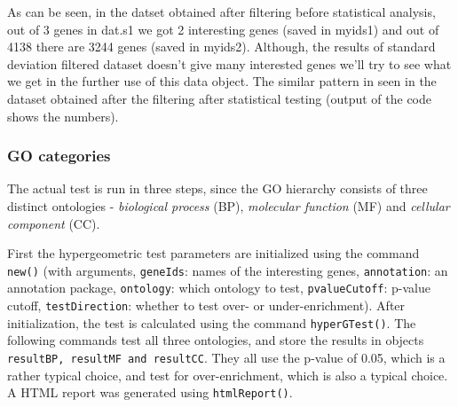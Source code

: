\documentclass[oneside, a4paper, 11pt]{book}
\begin{document}
As can be seen, in the datset obtained after filtering before statistical analysis, out of 3 genes in dat.s1 we got 2 interesting genes (saved in myids1) and out of 4138 there are 3244 genes (saved in myids2). Although, the results of standard deviation filtered dataset doesn't give many interested genes we'll try to see what we get in the further use of this data object. The similar pattern in seen in the dataset obtained after the filtering after statistical testing (output of the code shows the numbers).

\subsubsection{GO categories}
The actual test is run in three steps, since the GO hierarchy consists of three distinct ontologies - \textit{biological process} (BP), \textit{molecular function} (MF) and \textit{cellular component} (CC).

First the hypergeometric test parameters are initialized using the command \texttt{new()} (with arguments, \texttt{geneIds}: names of the interesting genes, \texttt{annotation}: an annotation
package, \texttt{ontology}: which ontology to test, \texttt{pvalueCutoff}: p-value cutoff, \texttt{testDirection}: whether to test over- or under-enrichment). After initialization, the test is calculated using the command \texttt{hyperGTest()}.
The following commands test all three ontologies, and store the results in objects \texttt{resultBP, resultMF and resultCC}. They all use the p-value of 0.05, which is a rather typical choice, and test for over-enrichment, which is also a typical choice. A HTML report was generated using \texttt{htmlReport()}.
\newline
\end{document}
